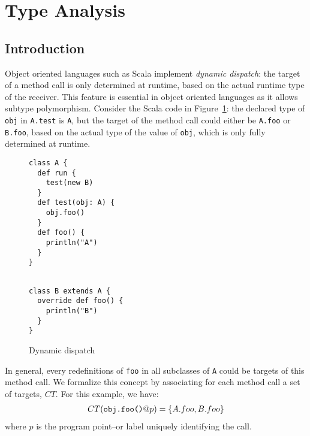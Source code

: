 \section{Type Analysis}

\subsection{Introduction}
Object oriented languages such as Scala implement \emph{dynamic dispatch}: the
target of a method call is only determined at runtime, based on the actual
runtime type of the receiver. This feature is essential in object oriented
languages as it allows subtype polymorphism. Consider the Scala code in
Figure~\ref{fig:ta:example1}: the declared type of \lstinline{obj} in
\lstinline{A.test} is \lstinline{A}, but the target of the method call could
either be \lstinline{A.foo} or \lstinline{B.foo}, based on the actual type of
the value of \lstinline{obj}, which is only fully determined at runtime.

\begin{figure}[h]
    \centering
\begin{minipage}[tl]{0.6\linewidth}
    \centering
\lstset{linewidth=0.6\linewidth}
\begin{lstlisting}
class A {
  def run {
    test(new B)
  }
  def test(obj: A) {
    obj.foo()
  }
  def foo() {
    println("A")
  }
}
\end{lstlisting}
\end{minipage}
\begin{minipage}[tl]{0.6\linewidth}
    \centering
\lstset{linewidth=0.6\linewidth}
\begin{lstlisting}

class B extends A {
  override def foo() {
    println("B")
  }
}
\end{lstlisting}
\end{minipage}
    \caption{Dynamic dispatch}
    \label{fig:ta:example1}
\end{figure}

In general, every redefinitions of \lstinline{foo} in all subclasses of \lstinline{A}
could be targets of this method call. We formalize this concept by associating
for each method call a set of targets, $CT$. For this example, we have:
\begin{eqnarray*}
    CT(\verb/obj.foo()/@p) = \{A.foo, B.foo\}
\end{eqnarray*}
where $p$ is the program point--or label uniquely identifying the call.


